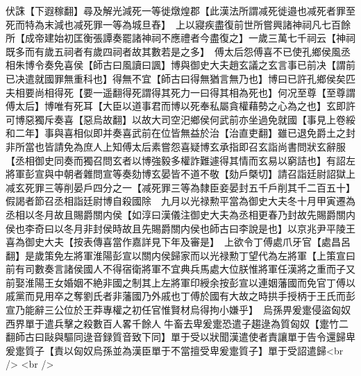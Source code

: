 伏誅【下遐稼翻】尋及解光減死一等徙燉煌郡【此漢法所謂减死徙邉也减死者罪至死而特為末減也减死罪一等為城旦舂】　上以寢疾盡復前世所嘗興諸神祠凡七百餘所【成帝建始初匡衡張譚奏罷諸神祠不應禮者今盡復之】一歲三萬七千祠云【神祠既多而有歲五祠者有歲四祠者故其數若是之多】　傅太后怨傅喜不已使孔鄉侯風丞相朱博令奏免喜侯【師古曰風讀曰諷】博與御史大夫趙玄議之玄言事已前决【謂前已决遣就國罪無重科也】得無不宜【師古曰得無猶言無乃也】博曰已許孔鄉侯矣匹夫相要尚相得死【要一遥翻得死謂得其死力一曰得其相為死也】何况至尊【至尊謂傅太后】博唯有死耳【大臣以道事君而博以死奉私屬貪權藉勢之心為之也】玄即許可博惡獨斥奏喜【惡烏故翻】以故大司空汜鄉侯何武前亦坐過免就國【事見上卷綏和二年】事與喜相似即并奏喜武前在位皆無益於治【治直吏翻】雖已退免爵土之封非所當也皆請免為庶人上知傅太后素嘗怨喜疑博玄承指即召玄詣尚書問狀玄辭服【丞相御史同奏而獨召問玄者以博強毅多權詐難遽得其情而玄易以窮詰也】有詔左將軍彭宣與中朝者雜問宣等奏劾博玄晏皆不道不敬【劾戶槩切】請召詣廷尉詔獄上减玄死罪三等削晏戶四分之一【减死罪三等為隸臣妾晏封五千戶削其千二百五十】假謁者節召丞相詣廷尉博自殺國除　九月以光禄勲平當為御史大夫冬十月甲寅遷為丞相以冬月故且賜爵關内侯【如淳曰漢儀注御史大夫為丞相更春乃封故先賜爵關内侯也李奇曰以冬月非封侯時故且先賜爵關内侯也師古曰李說是也】以京兆尹平陵王喜為御史大夫【按表傳喜當作嘉詳見下年及審是】　上欲令丁傅處爪牙官【處昌呂翻】是歲策免左將軍淮陽彭宣以關内侯歸家而以光禄勲丁望代為左將軍【上策宣曰前有司數奏言諸侯國人不得宿衛將軍不宜典兵馬處大位朕惟將軍任漢將之重而子又前娶淮陽王女婚姻不絶非國之制其上左將軍印綬余按彭宣以連姻藩國而免官丁傅以戚黨而見用卒之奪劉氏者非藩國乃外戚也丁傅於國有大故之時拱手授柄于王氏而彭宣乃能辭三公位於王莽專權之初任官惟賢材烏得拘小嫌乎】　烏孫畀爰疐侵盜匈奴西界單于遣兵擊之殺數百人畧千餘人牛畜去卑爰疐恐遣子趨逯為質匈奴【疐竹二翻師古曰敺與驅同逯音録質音致下同】單于受以狀聞漢遣使者責讓單于告令還歸卑爰疐質子【責以匈奴烏孫並為漢臣單于不當擅受卑爰疐質子】單于受詔遣歸<br />
<br />
